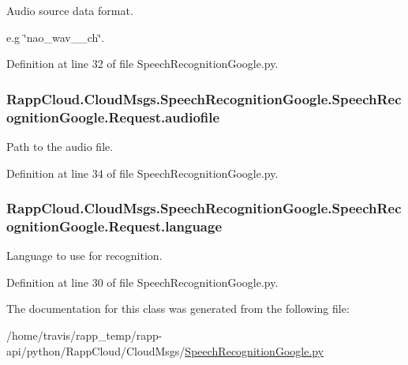Audio source data format. 

e.\-g \char`\"{}nao\-\_\-wav\-\_\-\_\-ch\char`\"{}. 

Definition at line 32 of file Speech\-Recognition\-Google.\-py.

\hypertarget{classRappCloud_1_1CloudMsgs_1_1SpeechRecognitionGoogle_1_1SpeechRecognitionGoogle_1_1Request_afee897847a40fcbbf122418e90d43972}{
\subsubsection[{audiofile}]{\setlength{\rightskip}{0pt plus 5cm}Rapp\-Cloud.\-Cloud\-Msgs.\-Speech\-Recognition\-Google.\-Speech\-Recognition\-Google.\-Request.\-audiofile}}\label{classRappCloud_1_1CloudMsgs_1_1SpeechRecognitionGoogle_1_1SpeechRecognitionGoogle_1_1Request_afee897847a40fcbbf122418e90d43972}


Path to the audio file. 



Definition at line 34 of file Speech\-Recognition\-Google.\-py.

\hypertarget{classRappCloud_1_1CloudMsgs_1_1SpeechRecognitionGoogle_1_1SpeechRecognitionGoogle_1_1Request_a9e71c439b362e7f7691a73d7b8418c55}{
\subsubsection[{language}]{\setlength{\rightskip}{0pt plus 5cm}Rapp\-Cloud.\-Cloud\-Msgs.\-Speech\-Recognition\-Google.\-Speech\-Recognition\-Google.\-Request.\-language}}\label{classRappCloud_1_1CloudMsgs_1_1SpeechRecognitionGoogle_1_1SpeechRecognitionGoogle_1_1Request_a9e71c439b362e7f7691a73d7b8418c55}


Language to use for recognition. 



Definition at line 30 of file Speech\-Recognition\-Google.\-py.



The documentation for this class was generated from the following file\-:\begin{DoxyCompactItemize}
\item 
/home/travis/rapp\-\_\-temp/rapp-\/api/python/\-Rapp\-Cloud/\-Cloud\-Msgs/\hyperlink{SpeechRecognitionGoogle_8py}{Speech\-Recognition\-Google.\-py}\end{DoxyCompactItemize}
